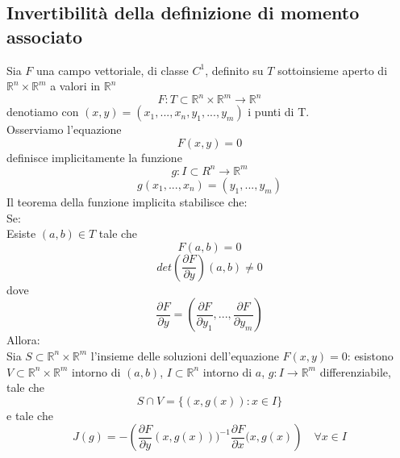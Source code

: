 \documentclass[
10pt, %
a4paper, %
oneside, %
headinclude,footinclude, %
BCOR5mm, %
]{scrartcl}
\begin{document}
\subsection{Invertibilità della definizione di momento associato}\label{ap:invertibile}
\begin{teorema}
	Sia \(F\) una campo vettoriale, di classe \(C^1\), definito su \(T\) sottoinsieme aperto di \(\mathbb{R}^{n}\times\mathbb{R}^m\) a valori in \(\mathbb{R}^n\) 
	\[ F:T\subset\mathbb{R}^{n}\times\mathbb{R}^m\rightarrow \mathbb{R}^n\]
	denotiamo con \((x, y) = (x_1, ..., x_n, y_1, ..., y_m)\) i punti di T.\\
	Osserviamo l'equazione
	\[F(x, y) = 0\]
	definisce implicitamente la funzione
	\[g:I\subset{R}^n\rightarrow\mathbb{R}^m\]
	\[g(x_1, ..., x_n) = (y_1, ..., y_m)\]
	Il teorema della funzione implicita stabilisce che:\\
	Se:\\
	Esiste \((a, b)\in T\) tale che
	\[F(a, b) = 0\]
	\[ det\left(\frac{\partial F}{\partial y}\right)(a, b)\neq 0 \]
	dove 
	\[\frac{\partial F}{\partial y} = \left(\frac{\partial F}{\partial y_1}, ..., \frac{\partial F}{\partial y_m}\right)\]
	Allora:\\
	Sia \(S\subset\mathbb{R}^n\times\mathbb{R}^m\) l'insieme delle soluzioni dell'equazione \(F(x, y) = 0\): esistono \(V\subset \mathbb{R}^n\times \mathbb{R}^m\) intorno di \((a, b)\), \(I \subset \mathbb{R}^n\) intorno di \(a\), \(g:I\rightarrow \mathbb{R}^m\) differenziabile, tale che 
	\[S\cap V = \{(x, g(x)):x\in I\}\]
	e tale che 
	\[J(g) = -\left(\frac{\partial F}{\partial y}(x, g(x)))^{-1}\frac{\partial F}{\partial x}(x, g(x)\right)\quad \forall x\in I\]
\end{teorema}
\end{document}
